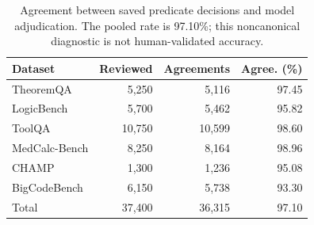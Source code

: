 \begin{table}[t]
\centering
\begin{minipage}{0.48\textwidth}
\centering
\small
\begin{tabular}{@{}lrrr@{}}
\toprule
Dataset & Reviewed & Agreements & Agree. (\%) \\
\midrule
TheoremQA & 5,250 & 5,116 & 97.45 \\
LogicBench & 5,700 & 5,462 & 95.82 \\
ToolQA & 10,750 & 10,599 & 98.60 \\
MedCalc-Bench & 8,250 & 8,164 & 98.96 \\
CHAMP & 1,300 & 1,236 & 95.08 \\
BigCodeBench & 6,150 & 5,738 & 93.30 \\
\midrule
Total & 37,400 & 36,315 & 97.10 \\
\bottomrule
\end{tabular}
\caption{Agreement between saved predicate decisions and model adjudication. The pooled rate is 97.10\%; this noncanonical diagnostic is not human-validated accuracy.}
\label{tab:app-evaluator-validation}
\end{minipage}
\end{table}
